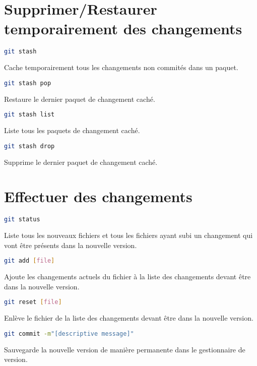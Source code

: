 \documentclass[10pt,landscape]{article}
\begin{document}
\begin{multicols*}{3}
\section{Supprimer/Restaurer temporairement des changements}
\begin{lstlisting}[language=bash]
git stash
\end{lstlisting}
Cache temporairement tous les changements non commités dans un paquet.
\begin{lstlisting}[language=bash]
git stash pop
\end{lstlisting}
Restaure le dernier paquet de changement caché.
\begin{lstlisting}[language=bash]
git stash list
\end{lstlisting}
Liste tous les paquets de changement caché.
\begin{lstlisting}[language=bash]
git stash drop
\end{lstlisting}
Supprime le dernier paquet de changement caché.

\section{Effectuer des changements}
\begin{lstlisting}[language=bash]
git status
\end{lstlisting}
Liste tous les nouveaux fichiers et tous les fichiers ayant subi un changement qui vont être présents dans la nouvelle version.
\begin{lstlisting}[language=bash]
git add [file]
\end{lstlisting}
Ajoute les changements actuels du fichier à la liste des changements devant être dans la nouvelle version.
\begin{lstlisting}[language=bash]
git reset [file]
\end{lstlisting}
Enlève le fichier de la liste des changements devant être dans la nouvelle version.
\begin{lstlisting}[language=bash]
git commit -m"[descriptive message]"
\end{lstlisting}
Sauvegarde la nouvelle version de manière permanente dans le gestionnaire de version.


\end{multicols*}
\end{document}
